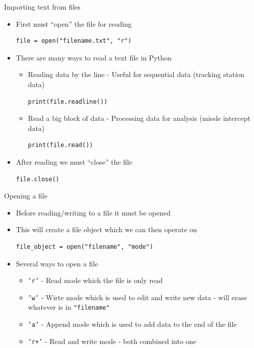 \documentclass[11pt,professionalfonts]{beamer}
\begin{document}
\begin{frame}[fragile]{Importing text from files}
    \begin{itemize}
        \item First must ``open'' the file for reading
\begin{verbatim}
file = open("filename.txt", "r")
\end{verbatim}
        \item There are many ways to read a text file in Python
            \begin{itemize}
                \item Reading data by the line - Useful for sequential data (tracking station data)
\begin{verbatim}
print(file.readline()) 
\end{verbatim}
                \item Read a big block of data - Processing data for analysis (missle intercept data)
\begin{verbatim}
print(file.read())
\end{verbatim}
    
            \end{itemize}
        \item After reading we must ``close'' the file
            \begin{verbatim}
file.close()
            \end{verbatim}
    \end{itemize}
\end{frame}

\begin{frame}[fragile]{Opening a file}
    \begin{itemize}
        \item Before reading/writing to a file it must be opened
        \item This will create a file object which we can then operate on
            \begin{verbatim}
file_object = open("filename", "mode")
            \end{verbatim}
        \item Several ways to open a file
            \begin{itemize}
                \item \texttt{'r'} - Read mode which the file is only read
                \item \texttt{'w'} - Wirte mode which is used to edit and write new data - will erase whatever is in \texttt{"filename"}
                \item \texttt{'a'} - Append mode which is used to add data to the end of the file
                \item \texttt{'r+'} - Read and write mode - both combined into one
            \end{itemize}
    \end{itemize}
\end{frame}
\end{document}
